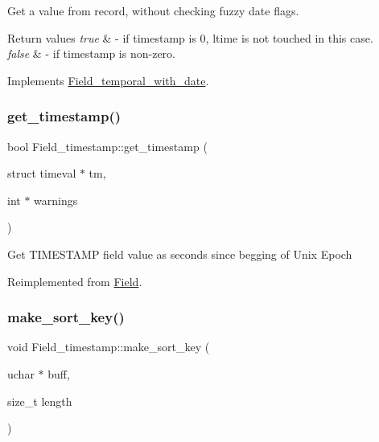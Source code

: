 Get a value from record, without checking fuzzy date flags. 
\begin{DoxyRetVals}{Return values}
{\em true} & -\/ if timestamp is 0, ltime is not touched in this case. \\
\hline
{\em false} & -\/ if timestamp is non-\/zero. \\
\hline
\end{DoxyRetVals}


Implements \mbox{\hyperlink{classField__temporal__with__date_aef905f77b5430dd2b3ef461ce916b4ef}{Field\+\_\+temporal\+\_\+with\+\_\+date}}.

\mbox{\label{classField__timestamp_a462bff06ee84cafedf33b0a23d56a0f2}} 
\subsubsection{\texorpdfstring{get\+\_\+timestamp()}{get\_timestamp()}}
{\footnotesize\ttfamily bool Field\+\_\+timestamp\+::get\+\_\+timestamp (\begin{DoxyParamCaption}\item[{struct timeval $\ast$}]{tm,  }\item[{int $\ast$}]{warnings }\end{DoxyParamCaption})\hspace{0.3cm}{\ttfamily [virtual]}}

Get T\+I\+M\+E\+S\+T\+A\+MP field value as seconds since begging of Unix Epoch 

Reimplemented from \mbox{\hyperlink{classField_ac6b92691afad064d5f80b762a39c0e7f}{Field}}.

\mbox{\label{classField__timestamp_a8c456053320d0e56a49214a68d814aa4}} 
\subsubsection{\texorpdfstring{make\+\_\+sort\+\_\+key()}{make\_sort\_key()}}
{\footnotesize\ttfamily void Field\+\_\+timestamp\+::make\+\_\+sort\+\_\+key (\begin{DoxyParamCaption}\item[{uchar $\ast$}]{buff,  }\item[{size\+\_\+t}]{length }\end{DoxyParamCaption})\hspace{0.3cm}{\ttfamily [virtual]}}

